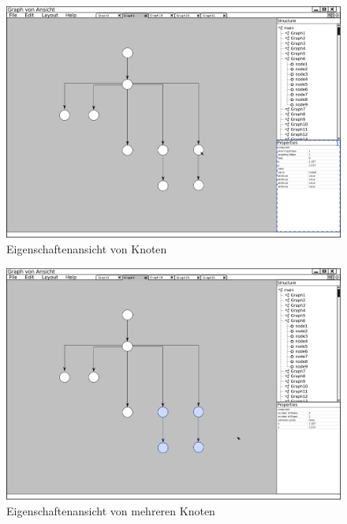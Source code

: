 \begin{figure}[ht]
  \centering
  \includegraphics[width=380pt]{resourcen/gui_view_showInfoInProperties_node.png}
  \caption{Eigenschaftenansicht von Knoten}
  \label{fig:gui_view_showInfoInProperties_node}
\end{figure}

\begin{figure}[hb]
  \centering
  \includegraphics[width=380pt]{resourcen/gui_view_showInfoInProperties_multi.png}
  \caption{Eigenschaftenansicht von mehreren Knoten}
  \label{fig:gui_view_showInfoInProperties_multi}
\end{figure}

